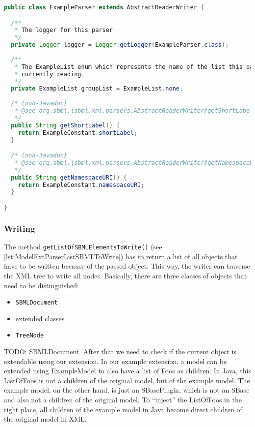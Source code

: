 \begin{lstlisting}[language=Java,caption={The first part of the parser for the extension},label={lst:ModelExtParserClass}]
public class ExampleParser extends AbstractReaderWriter {

  /**
   * The logger for this parser
   */
  private Logger logger = Logger.getLogger(ExampleParser.class);
  
  /**
   * The ExampleList enum which represents the name of the list this parser is
   * currently reading.
   */
  private ExampleList groupList = ExampleList.none;
  
  /* (non-Javadoc)
   * @see org.sbml.jsbml.xml.parsers.AbstractReaderWriter#getShortLabel()
   */
  public String getShortLabel() {
    return ExampleConstant.shortLabel;
  }

  /* (non-Javadoc)
   * @see org.sbml.jsbml.xml.parsers.AbstractReaderWriter#getNamespaceURI()
   */
  public String getNamespaceURI() {
    return ExampleConstant.namespaceURI;
  }

}
\end{lstlisting}


\subsubsection{Writing}

The method \texttt{getListOfSBMLElementsToWrite()} (see \ref{lst:ModelExtParserListSBMLToWrite}) has to return a list of all objects that have to be written because of the passed object.
This way, the writer can traverse the XML tree to write all nodes.
Basically, there are three classes of objects that need to be distinguished:
\begin{itemize}
 \item \texttt{SBMLDocument}
 \item extended classes
 \item \texttt{TreeNode}
\end{itemize}
TODO: SBMLDocument.
After that we need to check if the current object is extendable using our extension.
In our example extension, a model can be extended using ExampleModel to also have a list of Foos as children.
In Java, this ListOfFoos is not a children of the original model, but of the example model.
The example model, on the other hand, is just an SBasePlugin, which is not an SBase and also not a children of the original model.
To ``inject'' the ListOfFoos in the right place, all children of the example model in Java become direct children of the original model in XML.

